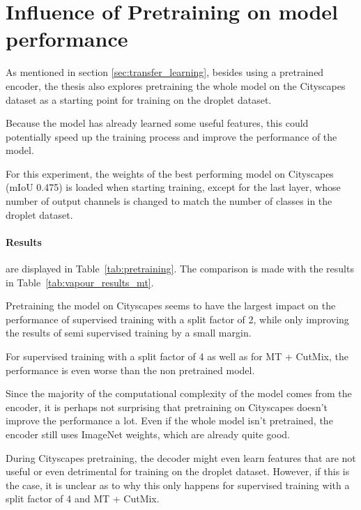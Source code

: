 \section{Influence of Pretraining on model performance}
\label{sec:pretraining}

As mentioned in section \ref{sec:transfer_learning}, besides using a pretrained encoder, the thesis also explores pretraining the whole model on the Cityscapes dataset as a starting point for training on the droplet dataset.

Because the model has already learned some useful features, this could potentially speed up the training process and improve the performance of the model. 

For this experiment, the weights of the best performing model on Cityscapes (mIoU \num{0.475}) is loaded when starting training, except for the last layer, whose number of output channels is changed to match the number of classes in the droplet dataset.

\paragraph{Results} are displayed in Table~\ref{tab:pretraining}. The comparison is made with the results in Table~\ref{tab:vapour_results_mt}.

Pretraining the model on Cityscapes seems to have the largest impact on the performance of supervised training with a split factor of 2, while only improving the results of semi supervised training by a small margin.

For supervised training with a split factor of 4 as well as for MT + CutMix, the performance is even worse than the non pretrained model.

Since the majority of the computational complexity of the model comes from the encoder, it is perhaps not surprising that pretraining on Cityscapes doesn't improve the performance a lot. 
Even if the whole model isn't pretrained, the encoder still uses ImageNet weights, which are already quite good. 

During Cityscapes pretraining, the decoder might even learn features that are not useful or even detrimental for training on the droplet dataset.
However, if this is the case, it is unclear as to why this only happens for supervised training with a split factor of 4 and MT + CutMix.

